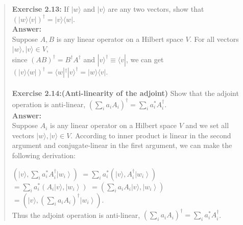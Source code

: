 \documentclass[UTF8]{ctexart}
\begin{document}
\begin{quote}
\textbf{Exercise 2.13:} If $|w\rangle$ and $|v\rangle$ are any two vectors, show that $(|w\rangle\langle v|)^{\dagger}=|v\rangle\langle w|$. \\
\textbf{Answer:}\\
	Suppose $A　,B$ is any linear operator on a Hilbert space $V$. For all vectors $ |w\rangle ,| v\rangle \in V$, \\ 
	since $(AB)^{\dagger}=B^{\dagger}A^{\dagger}$ and  $|v\rangle^{\dagger}\equiv\langle v|$, we can get $(|v\rangle\langle w|)^{\dagger}=\langle w|^{\dagger} | v\rangle^{\dagger}=|w\rangle\langle v|$. 
	\\ \\
\textbf{Exercise 2.14:(Anti-linearity of the adjoint)} Show that the adjoint operation is anti-linear,
	 $\left(\sum_{i} a_{i} A_{i}\right)^{\dagger}=\sum_{i} a_{i}^{*} A_{i}^{\dagger}$. \\  
\textbf{Answer:}\\
	 	Suppose $A_{i}$ is any linear operator on a Hilbert space $V$ and we set all vectors $ |w\rangle ,| v\rangle \in V$. 
According to  inner product is linear in the second argument and  conjugate-linear in the first argument, we can make the 	following derivation: 

	$\left(|v\rangle, \sum_{i} a_{i}^{*} A_{i}^{\dagger}\left|w_{i}\right\rangle\right)$ 
	$= \sum_{i} a_{i}^{*} \left(|v\rangle,A_{i}^{\dagger}\left|w_{i}\right\rangle\right)$  \\
	$=\sum_{i} a_{i}^{*} \left(A_{i}|v\rangle,\left|w_{i}\right\rangle\right)$
	$=\left(\sum_{i} a_{i}A_{i}|v\rangle,\left|w_{i}\right\rangle\right)$
	$=\left(|v\rangle, (\sum_{i} a_{i} A_{i})^{\dagger}\left|w_{i}\right\rangle\right)$.\\
	Thus the adjoint operation is anti-linear, $(\sum_{i} a_{i} A_{i})^{\dagger}=\sum_{i} a_{i}^{*} A_{i}^{\dagger}$.  \\ 
	

\end{quote}
\end{document}
